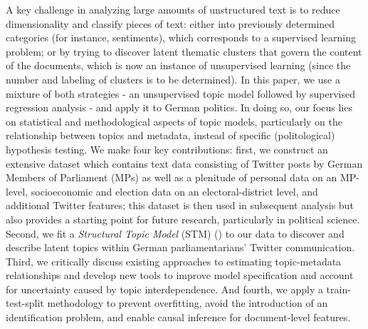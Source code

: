 A key challenge in analyzing large amounts of unstructured text is to reduce dimensionality and classify pieces of text: either into previously determined categories (for instance, sentiments), which corresponds to a supervised learning problem; or by trying to discover latent thematic clusters that govern the content of the documents, which is now an instance of unsupervised learning (since the number and labeling of clusters is to be determined). In this paper, we use a mixture of both strategies - an unsupervised topic model followed by supervised regression analysis - and apply it to German politics. In doing so, our focus lies on statistical and methodological aspects of topic models, particularly on the relationship between topics and metadata, instead of specific (politological) hypothesis testing. We make four key contributions: first, we construct an extensive dataset which contains text data consisting of Twitter posts by German Members of Parliament (MPs) as well as a plenitude of personal data on an MP-level, socioeconomic and election data on an electoral-district level, and additional Twitter features; this dataset is then used in subsequent analysis but also provides a starting point for future research, particularly in political science. Second, we fit a \textit{Structural Topic Model} (STM) (\citealp{roberts2016model}) to our data to discover and describe latent topics within German parliamentarians' Twitter communication. Third, we critically discuss existing approaches to estimating topic-metadata relationships and develop new tools to improve model specification and account for uncertainty caused by topic interdependence. And fourth, we apply a train-test-split methodology to prevent overfitting, avoid the introduction of an identification problem, and enable causal inference for document-level features.

